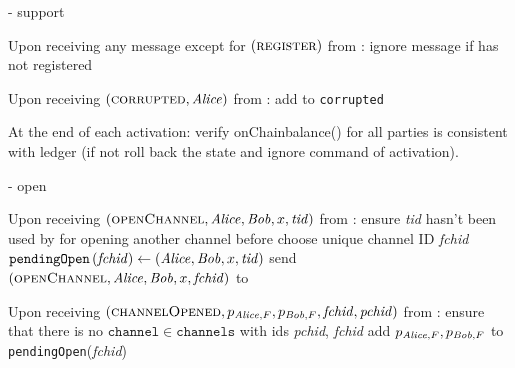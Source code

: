 \begin{systembox}{\fpaynet - support}
\begin{algorithmic}[1]
    \State Upon receiving any message except for
    $\left(\textsc{register}\right)$ from \alice:
    \Indent
      \State ignore message if \alice{} has not registered
    \EndIndent
    \State

    \State Upon receiving $\left(\textsc{corrupted}, \mathit{Alice}\right)$ from
    \simulator:
    \Indent
      \State add \alice{} to \texttt{corrupted}
    \EndIndent
    \State

    \State At the end of each activation: 
    \Indent
      \State verify onChainbalance() for all parties is consistent with ledger (if not roll back the state and ignore command of activation).
    \EndIndent
  \end{algorithmic}
\end{systembox}

\begin{systembox}{\fpaynet - open}
  \label{alg:fpaynet:open}
  \begin{algorithmic}[1]
    \State Upon receiving $\left(\textsc{openChannel}, \mathit{Alice}, \mathit{Bob}, x,
    \mathit{tid}\right)$ from \alice:
    \Indent
      \State ensure \textit{tid} hasn't been used by \alice{} for opening
      another channel before
      \State choose unique channel ID \textit{fchid}
      \State $\mathtt{pendingOpen}\left(\mathit{fchid}\right) \gets
      \left(\mathit{Alice}, \mathit{Bob}, x, \mathit{tid}\right)$
      \State send $\left(\textsc{openChannel}, \mathit{Alice}, \mathit{Bob}, x,
      \mathit{fchid}\right)$ to \simulator
    \EndIndent
    \State

    \State Upon receiving $\left(\textsc{channelOpened}, p_{\mathit{Alice}, F}, p_{\mathit{Bob},
    F}, \mathit{fchid}, \mathit{pchid}\right)$ from \simulator:
    \Indent
      \State ensure that there is no $\mathtt{channel} \in \mathtt{channels}$
      with ids \textit{pchid}, \textit{fchid}
      \State add $p_{\mathit{Alice}, F}, p_{\mathit{Bob}, F}$ to
      \texttt{pendingOpen}(\textit{fchid})
    \EndIndent
    \State


\end{algorithmic}
\end{systembox}
